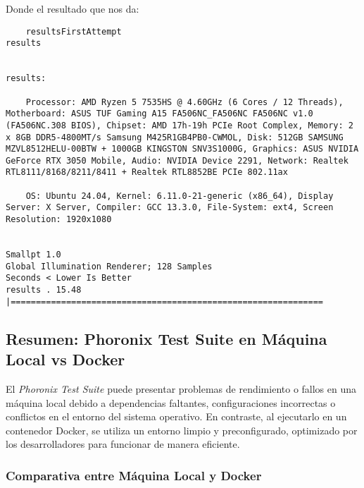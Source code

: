 Donde el resultado que nos da:

\begin{lstlisting}
    resultsFirstAttempt
results


results: 

	Processor: AMD Ryzen 5 7535HS @ 4.60GHz (6 Cores / 12 Threads), Motherboard: ASUS TUF Gaming A15 FA506NC_FA506NC FA506NC v1.0 (FA506NC.308 BIOS), Chipset: AMD 17h-19h PCIe Root Complex, Memory: 2 x 8GB DDR5-4800MT/s Samsung M425R1GB4PB0-CWMOL, Disk: 512GB SAMSUNG MZVL8512HELU-00BTW + 1000GB KINGSTON SNV3S1000G, Graphics: ASUS NVIDIA GeForce RTX 3050 Mobile, Audio: NVIDIA Device 2291, Network: Realtek RTL8111/8168/8211/8411 + Realtek RTL8852BE PCIe 802.11ax

	OS: Ubuntu 24.04, Kernel: 6.11.0-21-generic (x86_64), Display Server: X Server, Compiler: GCC 13.3.0, File-System: ext4, Screen Resolution: 1920x1080


Smallpt 1.0
Global Illumination Renderer; 128 Samples
Seconds < Lower Is Better
results . 15.48 |==============================================================

\end{lstlisting}



\subsection{Resumen: Phoronix Test Suite en Máquina Local vs Docker}

El \textit{Phoronix Test Suite} puede presentar problemas de rendimiento o fallos en una máquina local debido a dependencias faltantes, configuraciones incorrectas o conflictos en el entorno del sistema operativo. En contraste, al ejecutarlo en un contenedor Docker, se utiliza un entorno limpio y preconfigurado, optimizado por los desarrolladores para funcionar de manera eficiente.

\subsubsection{Comparativa entre Máquina Local y Docker}

